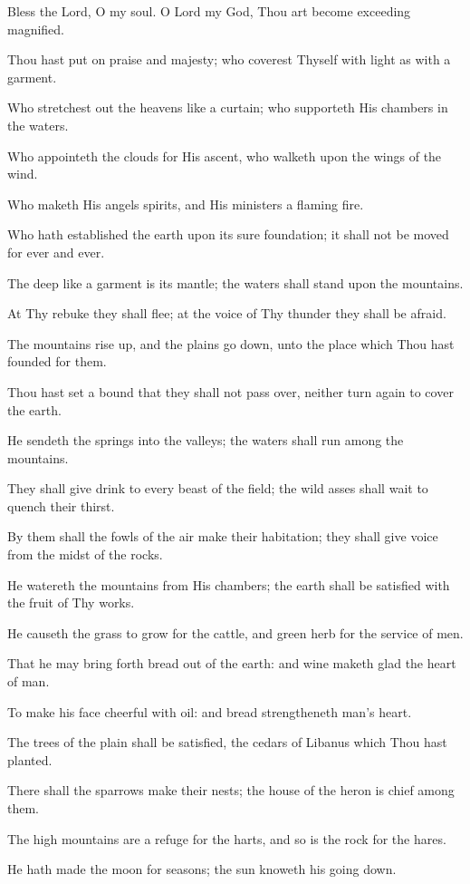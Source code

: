 Bless the Lord, O my soul. O Lord my God, Thou art become exceeding magnified.

Thou hast put on praise and majesty; who coverest Thyself with light as with a garment.

Who stretchest out the heavens like a curtain; who supporteth His chambers in the waters.

Who appointeth the clouds for His ascent, who walketh upon the wings of the wind.

Who maketh His angels spirits, and His ministers a flaming fire.

Who hath established the earth upon its sure foundation; it shall not be moved for ever and ever.

The deep like a garment is its mantle; the waters shall stand upon the mountains.

At Thy rebuke they shall flee; at the voice of Thy thunder they shall be afraid.

The mountains rise up, and the plains go down, unto the place which Thou hast founded for them.

Thou hast set a bound that they shall not pass over, neither turn again to cover the earth.

He sendeth the springs into the valleys; the waters shall run among the mountains.

They shall give drink to every beast of the field; the wild asses shall wait to quench their thirst.

By them shall the fowls of the air make their habitation; they shall give voice from the midst of the rocks.

He watereth the mountains from His chambers; the earth shall be satisfied with the fruit of Thy works.

He causeth the grass to grow for the cattle, and green herb for the service of men.

That he may bring forth bread out of the earth: and wine maketh glad the heart of man.

To make his face cheerful with oil: and bread strengtheneth man's heart.

The trees of the plain shall be satisfied, the cedars of Libanus which Thou hast planted.

There shall the sparrows make their nests; the house of the heron is chief among them.

The high mountains are a refuge for the harts, and so is the rock for the hares.

He hath made the moon for seasons; the sun knoweth his going down.

